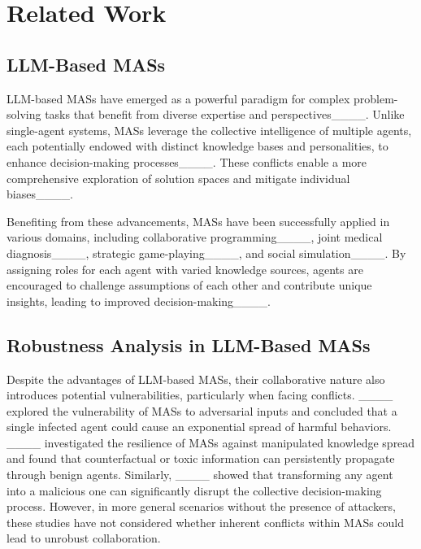 \section{Related Work}
\label{Sec: Related Work}

\subsection{LLM-Based MASs}
LLM-based MASs have emerged as a powerful paradigm for complex problem-solving tasks that benefit from diverse expertise and perspectives____. 
Unlike single-agent systems, MASs leverage the collective intelligence of multiple agents, each potentially endowed with distinct knowledge bases and personalities, to enhance decision-making processes____. 
These conflicts enable a more comprehensive exploration of solution spaces and mitigate individual biases____.

Benefiting from these advancements, MASs have been successfully applied in various domains, including collaborative programming____, joint medical diagnosis____, strategic game-playing____, and social simulation____. 
By assigning roles for each agent with varied knowledge sources, agents are encouraged to challenge assumptions of each other and contribute unique insights, leading to improved decision-making____.



\subsection{Robustness Analysis in LLM-Based MASs}
Despite the advantages of LLM-based MASs, their collaborative nature also introduces potential vulnerabilities, particularly when facing conflicts. 
____ explored the vulnerability of MASs to adversarial inputs and concluded that a single infected agent could cause an exponential spread of harmful behaviors. 
____ investigated the resilience of MASs against manipulated knowledge spread and found that counterfactual or toxic information can persistently propagate through benign agents. 
Similarly, ____ showed that transforming any agent into a malicious one can significantly disrupt the collective decision-making process. 
However, in more general scenarios without the presence of attackers, these studies have not considered whether inherent conflicts within MASs could lead to unrobust collaboration.

